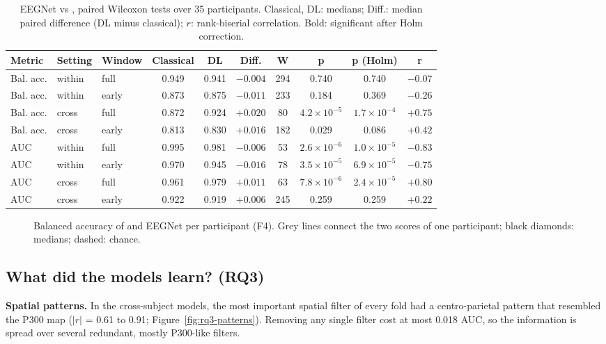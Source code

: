 \begin{table}[H]
\centering
\footnotesize
\caption{EEGNet vs , paired Wilcoxon tests over 35 participants. Classical, DL: medians; Diff.: median paired difference (DL minus classical); $r$: rank-biserial correlation. Bold: significant after Holm correction.}
\label{tab:rq2}
\setlength{\tabcolsep}{3pt}
\begin{tabular}{lllccccccc}
\toprule
\textbf{Metric} & \textbf{Setting} & \textbf{Window} & \textbf{Classical} & \textbf{DL} & \textbf{Diff.} & \textbf{W} & \textbf{p} & \textbf{p (Holm)} & \textbf{r} \\
\midrule
Bal. acc. & within & full & 0.949 & 0.941 & $-0.004$ & 294 & 0.740 & 0.740 & $-0.07$ \\
Bal. acc. & within & early & 0.873 & 0.875 & $-0.011$ & 233 & 0.184 & 0.369 & $-0.26$ \\
Bal. acc. & cross & full & 0.872 & 0.924 & $+0.020$ & 80 & $4.2 \times 10^{-5}$ & {\boldmath$1.7 \times 10^{-4}$} & $+0.75$ \\
Bal. acc. & cross & early & 0.813 & 0.830 & $+0.016$ & 182 & 0.029 & 0.086 & $+0.42$ \\
\midrule
AUC & within & full & 0.995 & 0.981 & $-0.006$ & 53 & $2.6 \times 10^{-6}$ & {\boldmath$1.0 \times 10^{-5}$} & $-0.83$ \\
AUC & within & early & 0.970 & 0.945 & $-0.016$ & 78 & $3.5 \times 10^{-5}$ & {\boldmath$6.9 \times 10^{-5}$} & $-0.75$ \\
AUC & cross & full & 0.961 & 0.979 & $+0.011$ & 63 & $7.8 \times 10^{-6}$ & {\boldmath$2.4 \times 10^{-5}$} & $+0.80$ \\
AUC & cross & early & 0.922 & 0.919 & $+0.006$ & 245 & 0.259 & 0.259 & $+0.22$ \\
\bottomrule
\end{tabular}
\end{table}

\begin{figure}[H]
\centering
{}
\caption{Balanced accuracy of  and EEGNet per participant (F4). Grey lines connect the two scores of one participant; black diamonds: medians; dashed: chance.}
\label{fig:rq2}
\end{figure}

\subsection{What did the models learn? (RQ3)}
\label{sec:res-rq3}
\textbf{Spatial patterns.} In the cross-subject  models, the most important spatial filter of every fold had a centro-parietal pattern that resembled the P300 map ($|r|$ = 0.61 to 0.91; Figure~\ref{fig:rq3-patterns}). Removing any single filter cost at most 0.018 AUC, so the information is spread over several redundant, mostly P300-like filters.


